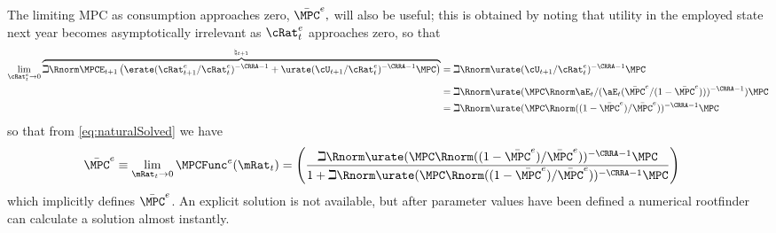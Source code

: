 \documentclass{\handout}
\begin{document}
The limiting MPC as consumption approaches zero, $\bar{\MPC}^{e},$ will also be useful; this is obtained
by noting that utility in the employed state next year becomes asymptotically irrelevant as ${\cRat}^{e}_{t}$ approaches zero, so that 
\begin{equation*}\begin{gathered}\begin{aligned}
  \lim_{{\cRat}^{e}_{t} \rightarrow 0}  \overbrace{ \beth \Rnorm \MPCE_{t+1} \left(\erate ({\cRat}^{e}_{t+1}/{\cRat}^{e}_{t})^{-\CRRA-1}  + \urate (\cU_{t+1}/{\cRat}^{e}_{t})^{-\CRRA-1}\MPCU\right)}^{\natural_{t+1}} & =  \beth \Rnorm \urate (\cU_{t+1}/{\cRat}^{e}_{t})^{-\CRRA-1}\MPCU
\\  & =  \beth \Rnorm \urate (\MPCU \Rnorm \aE_{t}/(\aE_{t}(\bar{\MPC}^{e}/(1-\bar{\MPC}^{e})))^{-\CRRA-1})\MPCU
\\ & =  \beth \Rnorm \urate (\MPCU \Rnorm ((1-\bar{\MPC}^{e})/\bar{\MPC}^{e}))^{-\CRRA-1}\MPCU
\end{aligned}\end{gathered}\end{equation*}
so that from \eqref{eq:naturalSolved} we have 
\begin{equation}\begin{gathered}\begin{aligned}
  \bar{\MPC}^{e} \equiv \lim_{\mRat_{t} \rightarrow 0} \MPCFunc^{e}(\mRat_{t}) & =  \left(\frac{
\beth \Rnorm \urate (\MPCU \Rnorm ((1-\bar{\MPC}^{e})/\bar{\MPC}^{e}))^{-\CRRA-1}\MPCU
}{1+
\beth \Rnorm \urate (\MPCU \Rnorm ((1-\bar{\MPC}^{e})/\bar{\MPC}^{e}))^{-\CRRA-1}\MPCU
}\right) \label{eq:MPCat0}
\end{aligned}\end{gathered}\end{equation}
which implicitly defines $\bar{\MPC}^{e}$.  An explicit solution is not available, but after 
parameter values have been defined a numerical rootfinder can calculate a solution almost instantly. 
\end{document}
